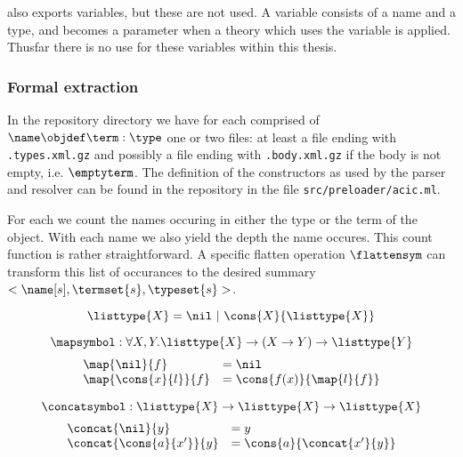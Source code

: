 \coq also exports variables, but these are not used.
A variable consists of a name and a type, and becomes a parameter when a theory which uses the variable is applied.
Thusfar there is no use for these variables within this thesis.

\subsubsection{Formal extraction}
In the repository \xml directory we have for each \coqobj[s] comprised of $\name \objdef \term : \type$
one or two files: at least a file ending with \lstinline{.types.xml.gz} and
possibly a file ending with \lstinline{.body.xml.gz} if the body is not empty, i.e. $\emptyterm$.
The definition of the constructors as used by the parser and resolver can be found
in the \roerei repository in the file \lstinline{src/preloader/acic.ml}.

For each \coqobj[s] we count the names occuring in either the type or the term of the object.
With each name we also yield the depth the name occures.
This count function is rather straightforward.
A specific flatten operation $\flattensym$ can transform this list of occurances to the desired summary $<\name[s], \termset{s}, \typeset{s}>$.

\begin{definition}
	\[ \listtype{X} = \nil ~|~ \cons{X}{\listtype{X}} \]
\end{definition}

\begin{definition}
  \[ \mapsymbol : \forall X, Y . \listtype{X} \rightarrow (X \rightarrow Y) \rightarrow \listtype{Y} \]
  \[ \begin{array}{ll}
      \map{\nil}{f} & = \nil \\
      \map{\cons{x}{l}}{f} & = \cons{f(x)}{\map{l}{f}} \\
    \end{array} \]
\end{definition}

\begin{definition}
  \[ \concatsymbol : \listtype{X} \rightarrow \listtype{X} \rightarrow \listtype{X} \]
  \[ \begin{array}{ll}
      \concat{\nil}{y} & = y \\
      \concat{\cons{a}{x'}}{y} & = \cons{a}{\concat{x'}{y}} \\
    \end{array} \]
\end{definition}

